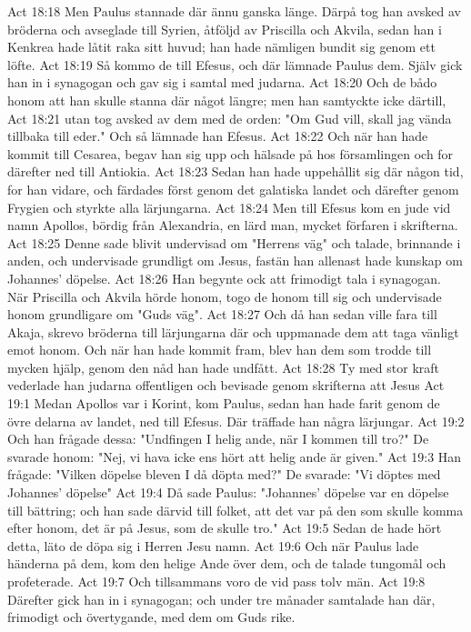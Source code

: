 Act 18:18  Men Paulus stannade där ännu ganska länge. Därpå tog han avsked av bröderna och avseglade till Syrien, åtföljd av Priscilla och Akvila, sedan han i Kenkrea hade låtit raka sitt huvud; han hade nämligen bundit sig genom ett löfte.
Act 18:19  Så kommo de till Efesus, och där lämnade Paulus dem. Själv gick han in i synagogan och gav sig i samtal med judarna.
Act 18:20  Och de bådo honom att han skulle stanna där något längre; men han samtyckte icke därtill,
Act 18:21  utan tog avsked av dem med de orden: "Om Gud vill, skall jag vända tillbaka till eder." Och så lämnade han Efesus.
Act 18:22  Och när han hade kommit till Cesarea, begav han sig upp och hälsade på hos församlingen och for därefter ned till Antiokia.
Act 18:23  Sedan han hade uppehållit sig där någon tid, for han vidare, och färdades först genom det galatiska landet och därefter genom Frygien och styrkte alla lärjungarna.
Act 18:24  Men till Efesus kom en jude vid namn Apollos, bördig från Alexandria, en lärd man, mycket förfaren i skrifterna.
Act 18:25  Denne sade blivit undervisad om "Herrens väg" och talade, brinnande i anden, och undervisade grundligt om Jesus, fastän han allenast hade kunskap om Johannes' döpelse.
Act 18:26  Han begynte ock att frimodigt tala i synagogan. När Priscilla och Akvila hörde honom, togo de honom till sig och undervisade honom grundligare om "Guds väg".
Act 18:27  Och då han sedan ville fara till Akaja, skrevo bröderna till lärjungarna där och uppmanade dem att taga vänligt emot honom. Och när han hade kommit fram, blev han dem som trodde till mycken hjälp, genom den nåd han hade undfått.
Act 18:28  Ty med stor kraft vederlade han judarna offentligen och bevisade genom skrifterna att Jesus
Act 19:1  Medan Apollos var i Korint, kom Paulus, sedan han hade farit genom de övre delarna av landet, ned till Efesus. Där träffade han några lärjungar.
Act 19:2  Och han frågade dessa: "Undfingen I helig ande, när I kommen till tro?" De svarade honom: "Nej, vi hava icke ens hört att helig ande är given."
Act 19:3  Han frågade: "Vilken döpelse bleven I då döpta med?" De svarade: "Vi döptes med Johannes' döpelse"
Act 19:4  Då sade Paulus: "Johannes' döpelse var en döpelse till bättring; och han sade därvid till folket, att det var på den som skulle komma efter honom, det är på Jesus, som de skulle tro."
Act 19:5  Sedan de hade hört detta, läto de döpa sig i Herren Jesu namn.
Act 19:6  Och när Paulus lade händerna på dem, kom den helige Ande över dem, och de talade tungomål och profeterade.
Act 19:7  Och tillsammans voro de vid pass tolv män.
Act 19:8  Därefter gick han in i synagogan; och under tre månader samtalade han där, frimodigt och övertygande, med dem om Guds rike.
